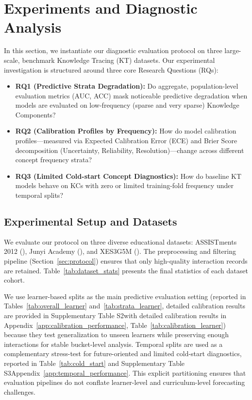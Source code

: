 \section{Experiments and Diagnostic Analysis}
\label{sec:experiments}

In this section, we instantiate our diagnostic evaluation protocol on three large-scale, benchmark Knowledge Tracing (KT) datasets. Our experimental investigation is structured around three core Research Questions (RQs):
\begin{itemize}
    \item \textbf{RQ1 (Predictive Strata Degradation):} Do aggregate, population-level evaluation metrics (AUC, ACC) mask noticeable predictive degradation when models are evaluated on low-frequency (sparse and very sparse) Knowledge Components?
    \item \textbf{RQ2 (Calibration Profiles by Frequency):} How do model calibration profiles—measured via Expected Calibration Error (ECE) and Brier Score decomposition (Uncertainty, Reliability, Resolution)—change across different concept frequency strata?
    \item \textbf{RQ3 (Limited Cold-start Concept Diagnostics):} How do baseline KT models behave on KCs with zero or limited training-fold frequency under temporal splits?
\end{itemize}

\subsection{Experimental Setup and Datasets}
We evaluate our protocol on three diverse educational datasets: ASSISTments 2012 (), Junyi Academy (), and XES3G5M (). The preprocessing and filtering pipeline (Section~\ref{sec:protocol}) ensures that only high-quality interaction records are retained. Table~\ref{tab:dataset_stats} presents the final statistics of each dataset cohort.

We use learner-based splits as the main predictive evaluation setting (reported in Tables~\ref{tab:overall_learner} and~\ref{tab:strata_learner}, \ifdefined\iscompact detailed calibration results are provided in Supplementary Table S2\else with detailed calibration results in Appendix~\ref{app:calibration_performance}, Table~\ref{tab:calibration_learner}\fi) because they test generalization to unseen learners while preserving enough interactions for stable bucket-level analysis. Temporal splits are used as a complementary stress-test for future-oriented and limited cold-start diagnostics, reported in Table~\ref{tab:cold_start} and \ifdefined\iscompact Supplementary Table S3\else Appendix~\ref{app:temporal_performance}\fi. This explicit partitioning ensures that evaluation pipelines do not conflate learner-level and curriculum-level forecasting challenges.

